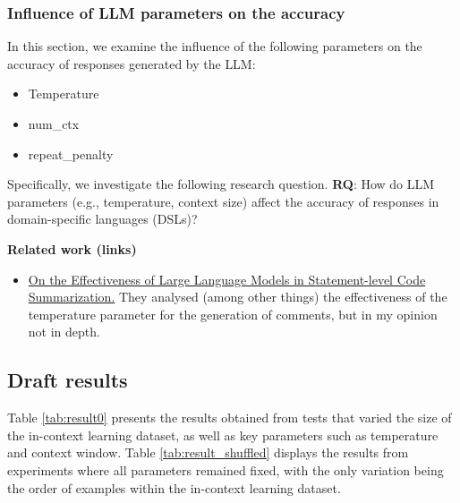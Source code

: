\subsubsection{Influence of LLM parameters on the accuracy}
In this section, we examine the influence of the following parameters on the accuracy of responses generated by the LLM:

\begin{itemize}
    \item Temperature
    \item num\_ctx
    \item repeat\_penalty
\end{itemize}

Specifically, we investigate the following research question.
\textbf{RQ}: How do LLM parameters (e.g., temperature, context size) affect the accuracy of responses in domain-specific languages (DSLs)?

\textbf{Related work (links)}
\begin{itemize}
    \item \href{https://ieeexplore.ieee.org/document/10684656}{On the Effectiveness of Large Language Models in Statement-level Code Summarization.} They analysed (among other things) the effectiveness of the temperature parameter for the generation of comments, but in my opinion not in depth.
\end{itemize}

\subsection{Draft results}

Table \ref{tab:result0} presents the results obtained from tests that varied the size of the in-context learning dataset, as well as key parameters such as temperature and context window.
Table \ref{tab:result_shuffled} displays the results from experiments where all parameters remained fixed, with the only variation being the order of examples within the in-context learning dataset.

